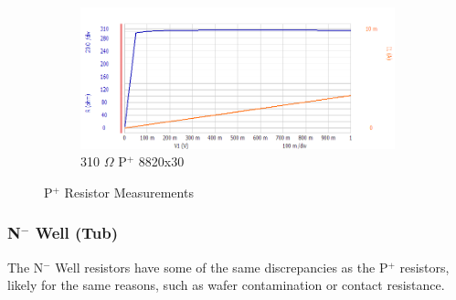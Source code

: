 \documentclass[letter,12pt]{article}
\begin{document}
\begin{figure}[h!]
\begin{subfigure}[b]{.45\textwidth}
					\includegraphics[width=\textwidth]{./Images/Probe_Test/R_PPlus_8820x30.png}
					\caption{310 $\Omega$ P$^+$ 8820x30}
				\end{subfigure}
				\caption{P$^+$ Resistor Measurements}
				\label{fig:R_PPlus_Measurements}
			\end{figure}
		
		\FloatBarrier	
		\subsubsection{N$^-$ Well (Tub)}
			The N$^-$ Well resistors have some of the same discrepancies as the P$^+$ resistors, likely for the same reasons, such as wafer contamination or contact resistance.
					
\end{document}
